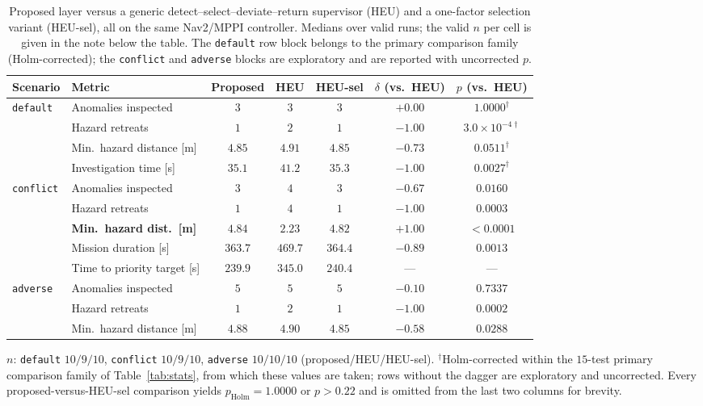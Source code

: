 \begin{table}[t]
\centering
\caption{Proposed layer versus a generic detect--select--deviate--return supervisor
(HEU) and a one-factor selection variant (HEU-sel), all on the same Nav2/MPPI
controller. Medians over valid runs; the valid $n$ per cell is given in the note below the table. The
\texttt{default} row block belongs to the primary comparison family
(Holm-corrected); the
\texttt{conflict} and \texttt{adverse} blocks are exploratory and are reported with
uncorrected $p$.}
\label{tab:heu}
\footnotesize
\setlength{\tabcolsep}{4pt}
\begin{tabular}{llccccc}
\hline
\textbf{Scenario} & \textbf{Metric} & \textbf{Proposed} & \textbf{HEU} &
\textbf{HEU-sel} & \textbf{$\delta$ (vs.\ HEU)} & \textbf{$p$ (vs.\ HEU)}\\
\hline
\texttt{default} & Anomalies inspected        & $3$     & $3$     & $3$     & $+0.00$ & $1.0000^{\dagger}$\\
                 & Hazard retreats            & $1$     & $2$     & $1$     & $-1.00$ & $3.0{\times}10^{-4\dagger}$\\
                 & Min.\ hazard distance [m]  & $4.85$  & $4.91$  & $4.85$  & $-0.73$ & $0.0511^{\dagger}$\\
                 & Investigation time [s]     & $35.1$  & $41.2$  & $35.3$  & $-1.00$ & $0.0027^{\dagger}$\\
\hline
\texttt{conflict} & Anomalies inspected       & $3$     & $4$     & $3$     & $-0.67$ & $0.0160$\\
                 & Hazard retreats            & $1$     & $4$     & $1$     & $-1.00$ & $0.0003$\\
                 & \textbf{Min.\ hazard dist.\ [m]} & $\mathbf{4.84}$ & $\mathbf{2.23}$ & $4.82$ & $+1.00$ & $<\!0.0001$\\
                 & Mission duration [s]       & $363.7$ & $469.7$ & $364.4$ & $-0.89$ & $0.0013$\\
                 & Time to priority target [s]& $239.9$ & $345.0$ & $240.4$ & ---     & ---\\
\hline
\texttt{adverse} & Anomalies inspected        & $5$     & $5$     & $5$     & $-0.10$ & $0.7337$\\
                 & Hazard retreats            & $1$     & $2$     & $1$     & $-1.00$ & $0.0002$\\
                 & Min.\ hazard distance [m]  & $4.88$  & $4.90$  & $4.85$  & $-0.58$ & $0.0288$\\
\hline
\end{tabular}

\vspace{2pt}
\footnotesize $n$: \texttt{default} $10/9/10$, \texttt{conflict} $10/9/10$,
\texttt{adverse} $10/10/10$ (proposed/HEU/HEU-sel).
$^{\dagger}$Holm-corrected within the $15$-test primary comparison family of
Table~\ref{tab:stats}, from which these values are taken; rows without the dagger
are exploratory and uncorrected. Every
proposed-versus-HEU-sel comparison yields $p_{\mathrm{Holm}}=1.0000$ or
$p>0.22$ and is omitted from the last two columns for brevity.
\end{table}

